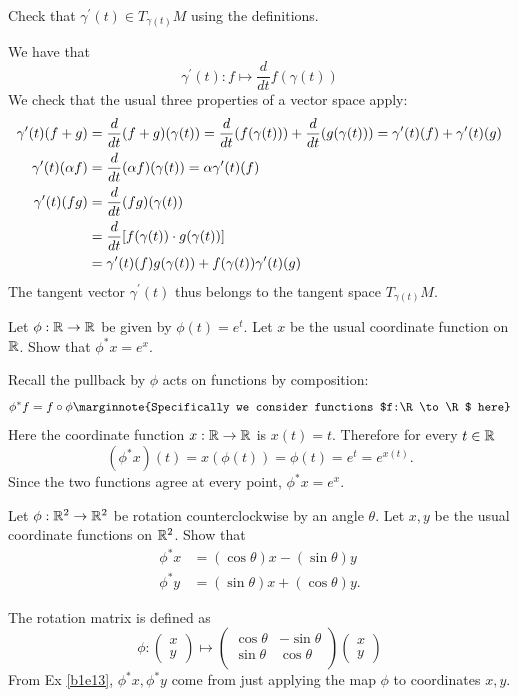 \documentclass[10pt]{article}
\begin{document}
\begin{example}\label{b1e12}
	Check that $\gamma^\prime(t) \in T_{\gamma(t)}M$ using the definitions.
\end{example}
\sol We have that
$$
	\gamma^\prime(t): f \mapsto \frac{d}{dt}f(\gamma(t))
$$
We check that the usual three properties of a vector space apply:
$$
\begin{aligned}
	\gamma^\prime(t)(f+g) &= \frac{d}{dt}(f+g)(\gamma(t)) = \frac{d}{dt}(f(\gamma(t))) + \frac{d}{dt}(g(\gamma(t))) = \gamma^\prime(t)(f) + \gamma^\prime(t)(g)\\
	\gamma^\prime(t)(\alpha f) &= \frac{d}{dt}(\alpha f)(\gamma(t)) = \alpha \gamma^\prime(t)(f)\\
	\gamma^\prime(t)(fg) &= \frac{d}{dt}(fg)(\gamma(t))\\
	&= \frac{d}{dt}\sparen*{f(\gamma(t)) \cdot g(\gamma(t))}\\
	&= \gamma^\prime(t)(f)g(\gamma(t)) + f(\gamma(t))\gamma^\prime(t)(g)
\end{aligned}
$$
The tangent vector $\gamma^\prime(t)$ thus belongs to the tangent space $T_{\gamma(t)}M$.


\begin{example}\label{b1e13}
	Let $\phi:\mathbb{R}\to\mathbb{R}$ be given by $\phi(t)=e^t$. Let $x$ be the usual coordinate function on $\mathbb{R}$.
	Show that $\phi^*x=e^x$.
\end{example}
\sol Recall the pullback by $\phi$ acts on functions by composition:
$$
\phi^*f = f\circ\phi \marginnote{Specifically we consider functions $f:\R\to\R$ here}
$$
Here the coordinate function $x:\mathbb{R}\to\mathbb{R}$ is $x(t)=t$. Therefore for every $t\in\mathbb{R}$
$$
(\phi^*x)(t)=x(\phi(t))=\phi(t)=e^{t}=e^{x(t)}.
$$
Since the two functions agree at every point, $\phi^*x=e^x$.



\begin{example}\label{b1e14}
	Let $\phi:\mathbb{R}^2\to\mathbb{R}^2$ be rotation counterclockwise by an angle $\theta$.
	Let $x, y$ be the usual coordinate functions on $\mathbb{R}^2$. Show that
	$$
		\begin{aligned}
			\phi^*x &= (\cos\theta)x - (\sin\theta)y\\
			\phi^*y &= (\sin\theta)x + (\cos\theta)y.
		\end{aligned}
	$$
\end{example}
\sol The rotation matrix is defined as
$$
\phi:\begin{pmatrix}
	x\\y
\end{pmatrix}\mapsto
\begin{pmatrix}
	\cos\theta&-\sin\theta\\
	\sin\theta& \cos\theta\\
\end{pmatrix}
\begin{pmatrix}
	x\\y
\end{pmatrix}
$$
From Ex \ref{b1e13}, $\phi^*x, \phi^*y$ come from just applying the map $\phi$ to coordinates $x,y$.
\end{document}

